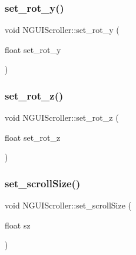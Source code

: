 \subsubsection{\texorpdfstring{set\+\_\+rot\+\_\+y()}{set\_rot\_y()}}
{\footnotesize\ttfamily void N\+G\+U\+I\+Scroller\+::set\+\_\+rot\+\_\+y (\begin{DoxyParamCaption}\item[{float}]{set\+\_\+rot\+\_\+y }\end{DoxyParamCaption})}

\hypertarget{class_n_g_u_i_scroller_ab8f6da1334390d4ec60df30039b57fdf}{}\label{class_n_g_u_i_scroller_ab8f6da1334390d4ec60df30039b57fdf} 
\subsubsection{\texorpdfstring{set\+\_\+rot\+\_\+z()}{set\_rot\_z()}}
{\footnotesize\ttfamily void N\+G\+U\+I\+Scroller\+::set\+\_\+rot\+\_\+z (\begin{DoxyParamCaption}\item[{float}]{set\+\_\+rot\+\_\+z }\end{DoxyParamCaption})}

\hypertarget{class_n_g_u_i_scroller_a7581a70f8cde29eef33fa38b1255111e}{}\label{class_n_g_u_i_scroller_a7581a70f8cde29eef33fa38b1255111e} 
\subsubsection{\texorpdfstring{set\+\_\+scroll\+Size()}{set\_scrollSize()}}
{\footnotesize\ttfamily void N\+G\+U\+I\+Scroller\+::set\+\_\+scroll\+Size (\begin{DoxyParamCaption}\item[{float}]{sz }\end{DoxyParamCaption})}

\hypertarget{class_n_g_u_i_scroller_a2eabb7269d0e830ca34c214115244727}{}\label{class_n_g_u_i_scroller_a2eabb7269d0e830ca34c214115244727} 
